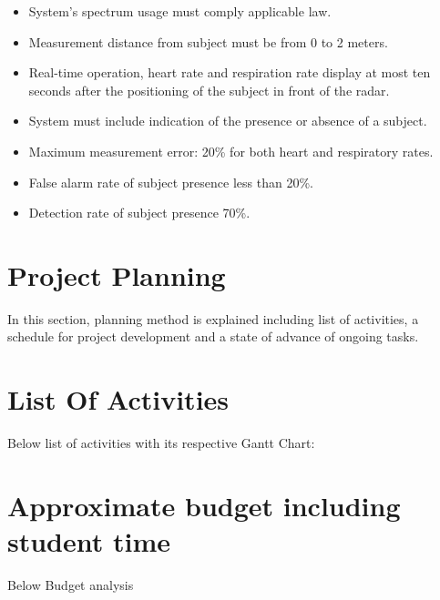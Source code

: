 \documentclass[lettersize,journal]{IEEEtran}
\begin{document}
\begin{itemize}
    \item System's spectrum usage must comply applicable law.
    \item Measurement distance from subject must be from 0 to 2 meters.
    \item Real-time operation, heart rate and respiration rate display at most ten seconds after the positioning of the subject in front of the radar.
    \item System must include indication of the presence or absence of a subject.
    \item Maximum measurement error: 20\% for both heart and respiratory rates.
    \item False alarm rate of subject presence less than 20\%.
    \item Detection rate of subject presence 70\%.
\end{itemize}



\section{Project Planning}

In this section, planning method is explained including list of activities, a schedule for project development and a state of advance of ongoing tasks. 

\section{List Of Activities}

Below list of activities with its respective Gantt Chart:


\section{Approximate budget including student time}

Below Budget analysis
\end{document}
